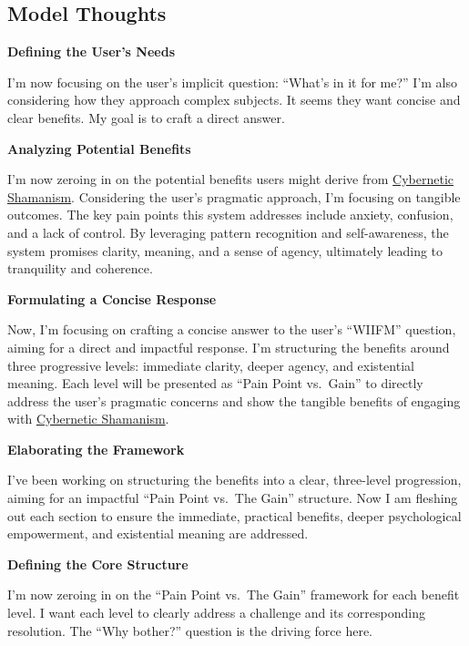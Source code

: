 \documentclass{article}
\begin{document}
\subsection*{Model Thoughts}\label{model-thoughts}

\textbf{Defining the User's Needs}

I'm now focusing on the user's implicit question: ``What's in it for me?'' I'm also considering how they approach complex subjects. It seems they want concise and clear benefits. My goal is to craft a direct answer.

\textbf{Analyzing Potential Benefits}

I'm now zeroing in on the potential benefits users might derive from \hyperlink{gloss:cybernetic_shamanism}{Cybernetic Shamanism}. Considering the user's pragmatic approach, I'm focusing on tangible outcomes. The key pain points this system addresses include anxiety, confusion, and a lack of control. By leveraging pattern recognition and self-awareness, the system promises clarity, meaning, and a sense of agency, ultimately leading to tranquility and coherence.

\textbf{Formulating a Concise Response}

Now, I'm focusing on crafting a concise answer to the user's ``WIIFM'' question, aiming for a direct and impactful response. I'm structuring the benefits around three progressive levels: immediate clarity, deeper agency, and existential meaning. Each level will be presented as ``Pain Point vs.~Gain'' to directly address the user's pragmatic concerns and show the tangible benefits of engaging with \hyperlink{gloss:cybernetic_shamanism}{Cybernetic Shamanism}.

\textbf{Elaborating the Framework}

I've been working on structuring the benefits into a clear, three-level progression, aiming for an impactful ``Pain Point vs.~The Gain'' structure. Now I am fleshing out each section to ensure the immediate, practical benefits, deeper psychological empowerment, and existential meaning are addressed.

\textbf{Defining the Core Structure}

I'm now zeroing in on the ``Pain Point vs.~The Gain'' framework for each benefit level. I want each level to clearly address a challenge and its corresponding resolution. The ``Why bother?'' question is the driving force here.
\end{document}
